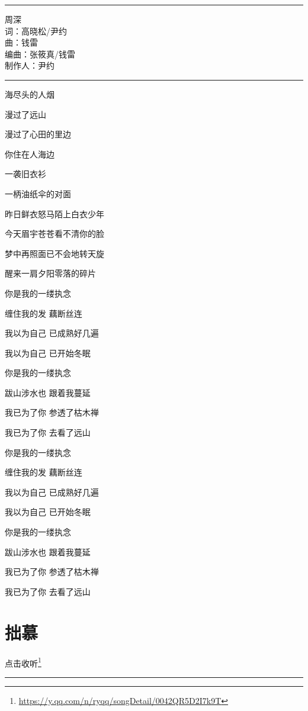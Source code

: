 \documentclass[]{ctexbook}
\renewcommand{\href}[2]{#2\footnote{\url{#1}}}
\begin{document}
\begin{center}\rule{0.5\linewidth}{0.5pt}\end{center}

周深\\
词：高晓松/尹约\\
曲：钱雷\\
编曲：张筱真/钱雷\\
制作人：尹约

\begin{center}\rule{0.5\linewidth}{0.5pt}\end{center}

海尽头的人烟

漫过了远山

漫过了心田的里边

你住在人海边

一袭旧衣衫

一柄油纸伞的对面

昨日鲜衣怒马陌上白衣少年

今天眉宇苍苍看不清你的脸

梦中再照面已不会地转天旋

醒来一肩夕阳零落的碎片

你是我的一缕执念

缠住我的发 藕断丝连

我以为自己 已成熟好几遍

我以为自己 已开始冬眠

你是我的一缕执念

跋山涉水也 跟着我蔓延

我已为了你 参透了枯木禅

我已为了你 去看了远山

你是我的一缕执念

缠住我的发 藕断丝连

我以为自己 已成熟好几遍

我以为自己 已开始冬眠

你是我的一缕执念

跋山涉水也 跟着我蔓延

我已为了你 参透了枯木禅

我已为了你 去看了远山

\section*{拙慕}\label{inferior-admiration}


\href{https://y.qq.com/n/ryqq/songDetail/0042QR5D2I7k9T}{点击收听}

\begin{center}\rule{0.5\linewidth}{0.5pt}\end{center}
\end{document}
